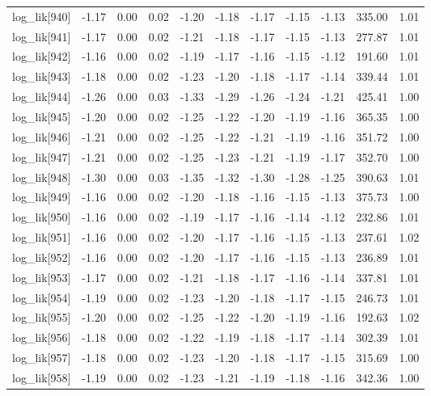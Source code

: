 \begin{table}[ht]
\begin{tabular}{rrrrrrrrrrr}
  log\_lik[940] & -1.17 & 0.00 & 0.02 & -1.20 & -1.18 & -1.17 & -1.15 & -1.13 & 335.00 & 1.01 \\ 
  log\_lik[941] & -1.17 & 0.00 & 0.02 & -1.21 & -1.18 & -1.17 & -1.15 & -1.13 & 277.87 & 1.01 \\ 
  log\_lik[942] & -1.16 & 0.00 & 0.02 & -1.19 & -1.17 & -1.16 & -1.15 & -1.12 & 191.60 & 1.01 \\ 
  log\_lik[943] & -1.18 & 0.00 & 0.02 & -1.23 & -1.20 & -1.18 & -1.17 & -1.14 & 339.44 & 1.01 \\ 
  log\_lik[944] & -1.26 & 0.00 & 0.03 & -1.33 & -1.29 & -1.26 & -1.24 & -1.21 & 425.41 & 1.00 \\ 
  log\_lik[945] & -1.20 & 0.00 & 0.02 & -1.25 & -1.22 & -1.20 & -1.19 & -1.16 & 365.35 & 1.00 \\ 
  log\_lik[946] & -1.21 & 0.00 & 0.02 & -1.25 & -1.22 & -1.21 & -1.19 & -1.16 & 351.72 & 1.00 \\ 
  log\_lik[947] & -1.21 & 0.00 & 0.02 & -1.25 & -1.23 & -1.21 & -1.19 & -1.17 & 352.70 & 1.00 \\ 
  log\_lik[948] & -1.30 & 0.00 & 0.03 & -1.35 & -1.32 & -1.30 & -1.28 & -1.25 & 390.63 & 1.01 \\ 
  log\_lik[949] & -1.16 & 0.00 & 0.02 & -1.20 & -1.18 & -1.16 & -1.15 & -1.13 & 375.73 & 1.00 \\ 
  log\_lik[950] & -1.16 & 0.00 & 0.02 & -1.19 & -1.17 & -1.16 & -1.14 & -1.12 & 232.86 & 1.01 \\ 
  log\_lik[951] & -1.16 & 0.00 & 0.02 & -1.20 & -1.17 & -1.16 & -1.15 & -1.13 & 237.61 & 1.02 \\ 
  log\_lik[952] & -1.16 & 0.00 & 0.02 & -1.20 & -1.17 & -1.16 & -1.15 & -1.13 & 236.89 & 1.01 \\ 
  log\_lik[953] & -1.17 & 0.00 & 0.02 & -1.21 & -1.18 & -1.17 & -1.16 & -1.14 & 337.81 & 1.01 \\ 
  log\_lik[954] & -1.19 & 0.00 & 0.02 & -1.23 & -1.20 & -1.18 & -1.17 & -1.15 & 246.73 & 1.01 \\ 
  log\_lik[955] & -1.20 & 0.00 & 0.02 & -1.25 & -1.22 & -1.20 & -1.19 & -1.16 & 192.63 & 1.02 \\ 
  log\_lik[956] & -1.18 & 0.00 & 0.02 & -1.22 & -1.19 & -1.18 & -1.17 & -1.14 & 302.39 & 1.01 \\ 
  log\_lik[957] & -1.18 & 0.00 & 0.02 & -1.23 & -1.20 & -1.18 & -1.17 & -1.15 & 315.69 & 1.00 \\ 
  log\_lik[958] & -1.19 & 0.00 & 0.02 & -1.23 & -1.21 & -1.19 & -1.18 & -1.16 & 342.36 & 1.00 \\ 

\end{tabular}
\end{table}
